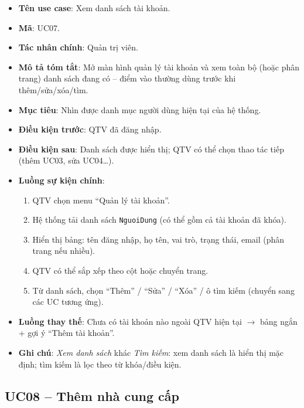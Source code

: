 \begin{itemize}[leftmargin=1.5cm]
    \item \textbf{Tên use case}: Xem danh sách tài khoản.
    \item \textbf{Mã}: UC07.
    \item \textbf{Tác nhân chính}: Quản trị viên.
    \item \textbf{Mô tả tóm tắt}: Mở màn hình quản lý tài khoản và xem toàn bộ (hoặc phân trang) danh sách đang có -- điểm vào thường dùng trước khi thêm/sửa/xóa/tìm.
    \item \textbf{Mục tiêu}: Nhìn được danh mục người dùng hiện tại của hệ thống.
    \item \textbf{Điều kiện trước}: QTV đã đăng nhập.
    \item \textbf{Điều kiện sau}: Danh sách được hiển thị; QTV có thể chọn thao tác tiếp (thêm UC03, sửa UC04\ldots).
    \item \textbf{Luồng sự kiện chính}:
    \begin{enumerate}
        \item QTV chọn menu ``Quản lý tài khoản''.
        \item Hệ thống tải danh sách \texttt{NguoiDung} (có thể gồm cả tài khoản đã khóa).
        \item Hiển thị bảng: tên đăng nhập, họ tên, vai trò, trạng thái, email (phân trang nếu nhiều).
        \item QTV có thể sắp xếp theo cột hoặc chuyển trang.
        \item Từ danh sách, chọn ``Thêm'' / ``Sửa'' / ``Xóa'' / ô tìm kiếm (chuyển sang các UC tương ứng).
    \end{enumerate}
    \item \textbf{Luồng thay thế}: Chưa có tài khoản nào ngoài QTV hiện tại $\rightarrow$ bảng ngắn + gợi ý ``Thêm tài khoản''.
    \item \textbf{Ghi chú}: \textit{Xem danh sách} khác \textit{Tìm kiếm}: xem danh sách là hiển thị mặc định; tìm kiếm là lọc theo từ khóa/điều kiện.
\end{itemize}

\subsection{UC08 -- Thêm nhà cung cấp}

